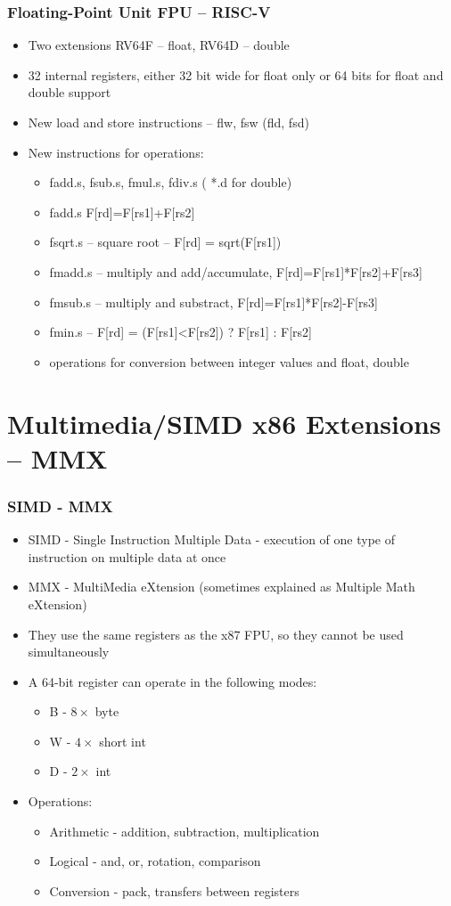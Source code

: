 \documentclass{beamer}
\begin{document}
\begin{frame}
\frametitle{Floating-Point Unit FPU -- RISC-V}
\begin{itemize}
\item Two extensions RV64F – float, RV64D – double
\item 32 internal registers, either 32 bit wide for float only or 64 bits for float and double support
\item New load and store instructions – flw, fsw (fld, fsd)
\item New instructions for operations:
\begin{itemize}
\item fadd.s, fsub.s, fmul.s, fdiv.s ( *.d for double)
\item fadd.s   F[rd]=F[rs1]+F[rs2] 
\item fsqrt.s -- square root -- F[rd] = sqrt(F[rs1])
\item fmadd.s -- multiply and add/accumulate, F[rd]=F[rs1]*F[rs2]+F[rs3]
\item fmsub.s -- multiply and substract, F[rd]=F[rs1]*F[rs2]-F[rs3]
\item fmin.s -- F[rd] = (F[rs1]<F[rs2]) ? F[rs1] : F[rs2]
\item operations for conversion between integer values and float, double
\end{itemize}
\end{itemize}
\end{frame}

\section{Multimedia/SIMD x86 Extensions -- MMX}


\begin{frame}
\frametitle{SIMD - MMX}

\begin{itemize}
\item SIMD - Single Instruction Multiple Data - execution of one type of instruction on multiple data at once
\item MMX - MultiMedia eXtension (sometimes explained as Multiple Math eXtension)
\item They use the same registers as the x87 FPU, so they cannot be used simultaneously
\item A 64-bit register can operate in the following modes:
\begin{itemize}
\item B - $8\times$ byte
\item W - $4\times$ short int
\item D - $2\times$ int
\end{itemize}
\item Operations:
\begin{itemize}
\item Arithmetic - addition, subtraction, multiplication
\item Logical - and, or, rotation, comparison
\item Conversion - pack, transfers between registers
\end{itemize}
\end{itemize}
\end{frame}
\end{document}

